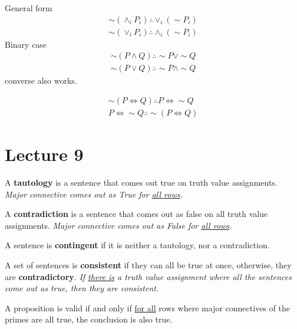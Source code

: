 \documentclass[11pt]{article}
\begin{document}
		\begin{rules}
			General form
			\begin{gather}
				\sim(\land_{i}P_i) \therefore \lor_i (\sim P_i) \\
				\sim(\lor_{i}P_i) \therefore \land_i (\sim P_i)
			\end{gather}
			Binary case
			\begin{gather}
				\sim (P \land Q) \therefore \sim P \lor \sim Q \\
				\sim (P \lor Q) \therefore \sim P \land \sim Q
			\end{gather}
			converse also works.
		\end{rules}
		
		\begin{rules}
			\begin{gather}
				\sim(P \iff Q) \therefore P \iff \sim Q\\
				P \iff \sim Q \therefore \sim (P \iff Q)
			\end{gather}
		\end{rules}
		
	\section{Lecture 9}
		\begin{definition}
			A \textbf{tautology} is a sentence that comes out true on truth value assignments. \emph{Major connective comes out as True for \ul{all rows}.}
		\end{definition}
		
		\begin{definition}
			A \textbf{contradiction} is a sentence that comes out as false on all truth value assignments. \emph{Major connective comes out as False for \ul{all rows}.}
		\end{definition}
		
		\begin{definition}
			A sentence is \textbf{contingent} if it is neither a tautology, nor a contradiction.
		\end{definition}
		
		\begin{definition}
			A set of sentences is \textbf{consistent} if they can all be true at once, otherwise, they are \textbf{contradictory}. \emph{If \ul{there is} a truth value assignment where all the sentences come out as true, then they are consistent.}
		\end{definition}
		
		\begin{remark}
			A proposition is valid if and only if \ul{for all} rows where major connectives of the primes are all true, the  conclusion is also true.
		\end{remark}
\end{document}
